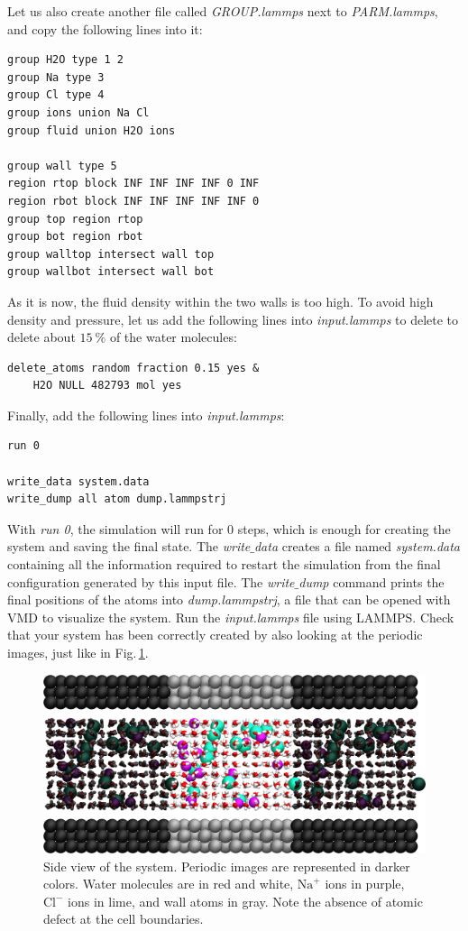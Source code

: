 \documentclass[9pt,tutorial]{livecoms}
\begin{document}
Let us also create another file called \textit{GROUP.lammps} next to \textit{PARM.lammps}, and copy the following lines into it:
{\normalsize \begin{verbatim}
group H2O type 1 2
group Na type 3
group Cl type 4
group ions union Na Cl
group fluid union H2O ions

group wall type 5
region rtop block INF INF INF INF 0 INF
region rbot block INF INF INF INF INF 0
group top region rtop
group bot region rbot
group walltop intersect wall top
group wallbot intersect wall bot
\end{verbatim}}
As it is now, the fluid density within the two walls is too high. To avoid high density and pressure, let us add the following lines into \textit{input.lammps} to delete to delete about $15~\%$ of the water molecules:
{\normalsize \begin{verbatim}
delete_atoms random fraction 0.15 yes &
    H2O NULL 482793 mol yes
\end{verbatim}}
Finally, add the following lines into \textit{input.lammps}:
{\normalsize \begin{verbatim}
run 0

write_data system.data
write_dump all atom dump.lammpstrj
\end{verbatim}}
With \textit{run 0}, the simulation will run for 0 steps, which is enough for creating the system and saving the final state. The \textit{write$\_$data} creates a file named \textit{system.data} containing all the information required to restart the
simulation from the final configuration generated by this input file. The \textit{write$\_$dump} command prints the final
positions of the atoms into \textit{dump.lammpstrj}, a file that can be opened with VMD to visualize the system. Run the \textit{input.lammps} file using LAMMPS. Check that your system has been correctly created by also looking at the periodic images, just like in Fig.\,\ref{fig:NANOSHEAR-system}.

\begin{figure}
\centering
\includegraphics[width=\linewidth]{NANOSHEAR-system}
\caption{Side view of the system. Periodic images are represented in darker colors. Water molecules are in red and white, $\text{Na}^+$ ions in purple, $\text{Cl}^-$ ions in lime, and wall atoms in gray. Note the absence of atomic defect at the cell boundaries.}
\label{fig:NANOSHEAR-system}
\end{figure}
\end{document}
